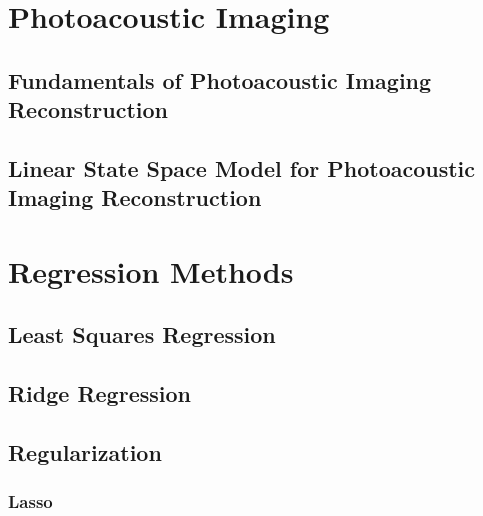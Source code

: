 \section{Photoacoustic Imaging} \label{sec:lit}

\subsection{Fundamentals of Photoacoustic Imaging Reconstruction} \label{sec:lit:one}

\subsection{Linear State Space Model for Photoacoustic Imaging Reconstruction} \label{sec:lit:two}

\section{Regression Methods} \label{sec:lit:first}

\subsection{Least Squares Regression} \label{sec:lit:first:one}

\subsection{Ridge Regression} \label{sec:lit:first:two}

\subsection{Regularization} \label{sec:lit:first:three}

\subsubsection{Lasso} \label{sec:lit:first:three:one}

